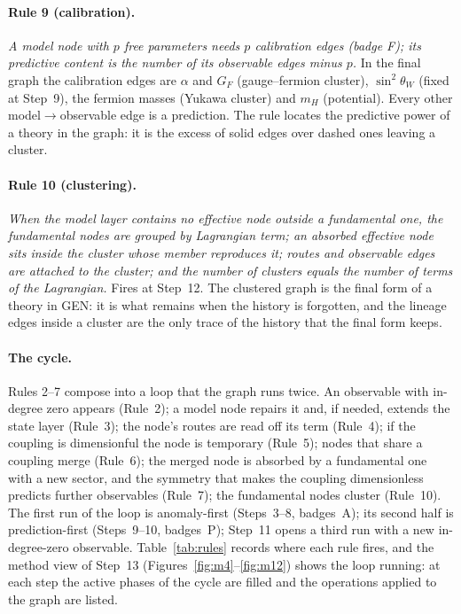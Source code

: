 \paragraph{Rule 9 (calibration).} \emph{A model node with $p$ free parameters needs $p$ calibration edges (badge F); its predictive content is the number of its observable edges minus $p$.} In the final graph the calibration edges are $\alpha$ and $G_F$ (gauge--fermion cluster), $\sin^2\theta_W$ (fixed at Step~9), the fermion masses (Yukawa cluster) and $m_H$ (potential). Every other model$\to$observable edge is a prediction. The rule locates the predictive power of a theory in the graph: it is the excess of solid edges over dashed ones leaving a cluster.

\paragraph{Rule 10 (clustering).} \emph{When the model layer contains no effective node outside a fundamental one, the fundamental nodes are grouped by Lagrangian term; an absorbed effective node sits inside the cluster whose member reproduces it; routes and observable edges are attached to the cluster; and the number of clusters equals the number of terms of the Lagrangian.} Fires at Step~12. The clustered graph is the final form of a theory in GEN: it is what remains when the history is forgotten, and the lineage edges inside a cluster are the only trace of the history that the final form keeps.

\paragraph{The cycle.} Rules 2--7 compose into a loop that the graph runs twice. An observable with in-degree zero appears (Rule~2); a model node repairs it and, if needed, extends the state layer (Rule~3); the node's routes are read off its term (Rule~4); if the coupling is dimensionful the node is temporary (Rule~5); nodes that share a coupling merge (Rule~6); the merged node is absorbed by a fundamental one with a new sector, and the symmetry that makes the coupling dimensionless predicts further observables (Rule~7); the fundamental nodes cluster (Rule~10). The first run of the loop is anomaly-first (Steps~3--8, badges~A); its second half is prediction-first (Steps~9--10, badges~P); Step~11 opens a third run with a new in-degree-zero observable. Table~\ref{tab:rules} records where each rule fires, and the method view of Step~13 (Figures~\ref{fig:m4}--\ref{fig:m12}) shows the loop running: at each step the active phases of the cycle are filled and the operations applied to the graph are listed.


